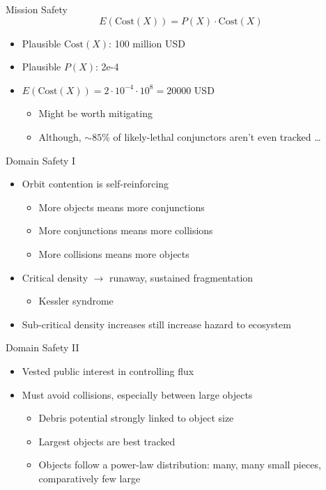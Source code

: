 \documentclass[pdf]{beamer}
\begin{document}
\begin{frame}{Mission Safety}
  \[ E(\text{Cost}(X)) = P(X) \cdot \text{Cost}(X) \]
  
  \begin{itemize}
  \item Plausible $\text{Cost}(X)$: 100 million USD
  \item Plausible $P(X)$: 2e-4
  \item $E(\text{Cost}(X)) = 2 \cdot 10^{-4} \cdot 10^8 = 20000$ USD
    \begin{itemize}
    \item Might be worth mitigating
    \item Although, $\sim 85\%$ of likely-lethal conjunctors aren't even
      tracked \ldots
    \end{itemize}
  \end{itemize}
\end{frame}

\begin{frame}{Domain Safety I}

  \begin{itemize}
  \item Orbit contention is self-reinforcing
    \begin{itemize}
    \item More objects means more conjunctions
    \item More conjunctions means more collisions
    \item More collisions means more objects
    \end{itemize}
  \item Critical density $\rightarrow$ runaway, sustained fragmentation
    \begin{itemize}
    \item Kessler syndrome
    \end{itemize}
  \item Sub-critical density increases still increase hazard to ecosystem
  \end{itemize}
\end{frame}

\begin{frame}{Domain Safety II}
  \begin{itemize}
  \item Vested public interest in controlling flux
  \item Must avoid collisions, especially between large objects
    \begin{itemize}
    \item Debris potential strongly linked to object size
    \item Largest objects are best tracked
    \item Objects follow a power-law distribution: many, many small pieces,
      comparatively few large
    \end{itemize}
  \end{itemize}
\end{frame}
\end{document}
